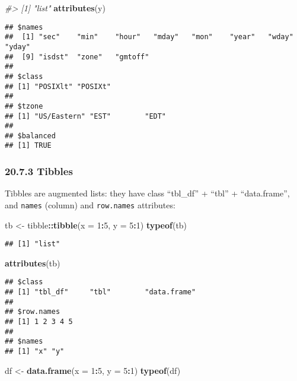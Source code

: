 \documentclass[
]{article}
\newenvironment{Shaded}{\begin{snugshade}}{\end{snugshade}}
\newcommand{\AttributeTok}[1]{\textcolor[rgb]{0.13,0.29,0.53}{#1}}
\newcommand{\CommentTok}[1]{\textcolor[rgb]{0.56,0.35,0.01}{\textit{#1}}}
\newcommand{\DecValTok}[1]{\textcolor[rgb]{0.00,0.00,0.81}{#1}}
\newcommand{\FunctionTok}[1]{\textcolor[rgb]{0.13,0.29,0.53}{\textbf{#1}}}
\newcommand{\NormalTok}[1]{#1}
\newcommand{\OtherTok}[1]{\textcolor[rgb]{0.56,0.35,0.01}{#1}}
\newcommand{\SpecialCharTok}[1]{\textcolor[rgb]{0.81,0.36,0.00}{\textbf{#1}}}
\begin{document}
\begin{Shaded}
\begin{Highlighting}[]
\CommentTok{\#\textgreater{} [1] "list"}
\FunctionTok{attributes}\NormalTok{(y)}
\end{Highlighting}
\end{Shaded}

\begin{verbatim}
## $names
##  [1] "sec"    "min"    "hour"   "mday"   "mon"    "year"   "wday"   "yday"  
##  [9] "isdst"  "zone"   "gmtoff"
## 
## $class
## [1] "POSIXlt" "POSIXt" 
## 
## $tzone
## [1] "US/Eastern" "EST"        "EDT"       
## 
## $balanced
## [1] TRUE
\end{verbatim}

\hypertarget{tibbles-1}{%
\subsubsection{20.7.3 Tibbles}\label{tibbles-1}}

Tibbles are augmented lists: they have class ``tbl\_df'' + ``tbl'' +
``data.frame'', and \texttt{names} (column) and \texttt{row.names}
attributes:

\begin{Shaded}
\begin{Highlighting}[]
\NormalTok{tb }\OtherTok{\textless{}{-}}\NormalTok{ tibble}\SpecialCharTok{::}\FunctionTok{tibble}\NormalTok{(}\AttributeTok{x =} \DecValTok{1}\SpecialCharTok{:}\DecValTok{5}\NormalTok{, }\AttributeTok{y =} \DecValTok{5}\SpecialCharTok{:}\DecValTok{1}\NormalTok{)}
\FunctionTok{typeof}\NormalTok{(tb)}
\end{Highlighting}
\end{Shaded}

\begin{verbatim}
## [1] "list"
\end{verbatim}

\begin{Shaded}
\begin{Highlighting}[]
\FunctionTok{attributes}\NormalTok{(tb)}
\end{Highlighting}
\end{Shaded}

\begin{verbatim}
## $class
## [1] "tbl_df"     "tbl"        "data.frame"
## 
## $row.names
## [1] 1 2 3 4 5
## 
## $names
## [1] "x" "y"
\end{verbatim}

\begin{Shaded}
\begin{Highlighting}[]
\NormalTok{df }\OtherTok{\textless{}{-}} \FunctionTok{data.frame}\NormalTok{(}\AttributeTok{x =} \DecValTok{1}\SpecialCharTok{:}\DecValTok{5}\NormalTok{, }\AttributeTok{y =} \DecValTok{5}\SpecialCharTok{:}\DecValTok{1}\NormalTok{)}
\FunctionTok{typeof}\NormalTok{(df)}
\end{Highlighting}
\end{Shaded}
\end{document}
